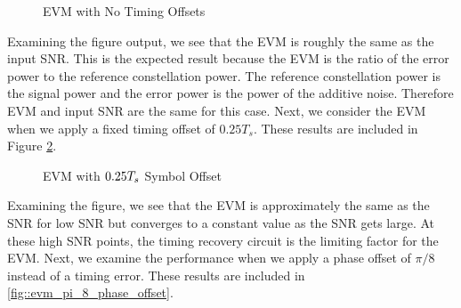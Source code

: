 \documentclass{article}
\begin{document}
\begin{figure}[H]
	\centerline{}
	\caption{EVM with No Timing Offsets}
	\label{fig::evm_no_timing_offset}
\end{figure}

Examining the figure output, we see that the EVM is roughly the same as the input SNR. This is the expected result because the EVM is the ratio of the error power to the reference constellation power. The reference constellation power is the signal power and the error power is the power of the additive noise. Therefore EVM and input SNR are the same for this case. Next, we consider the EVM when we apply a fixed timing offset of $0.25T_s$. These results are included in Figure \ref{fig::evm_0p25_symbol_offset}.

\begin{figure}[H]
	\centerline{}
	\caption{EVM with $\protect{0.25T_s}$ Symbol Offset}
	\label{fig::evm_0p25_symbol_offset}
\end{figure}

Examining the figure, we see that the EVM is approximately the same as the SNR for low SNR but converges to a constant value as the SNR gets large. At these high SNR points, the timing recovery circuit is the limiting factor for the EVM. Next, we examine the performance when we apply a phase offset of $\pi/8$ instead of a timing error. These results are included in \ref{fig::evm_pi_8_phase_offset}.
\end{document}
